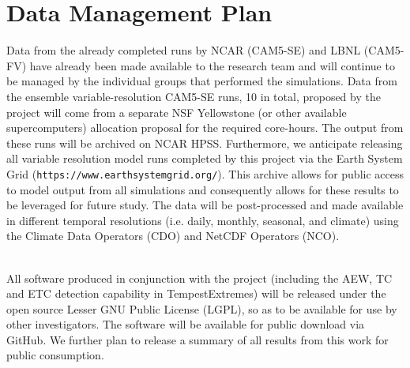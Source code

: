\documentclass[11pt]{article}
\begin{document}
\appendix

\setcounter{section}{9}

\section{Data Management Plan}

Data from the already completed runs by NCAR (CAM5-SE) and LBNL (CAM5-FV) have already been made available to the research team and will continue to be managed by the individual groups that performed the simulations. Data from the ensemble variable-resolution CAM5-SE runs, 10 in total, proposed by the project will come from a separate NSF Yellowstone (or other available supercomputers) allocation proposal for the required core-hours. The output from these runs will be archived on NCAR HPSS. Furthermore, we anticipate releasing all variable resolution model runs completed by this project via the Earth System Grid (\texttt{https://www.earthsystemgrid.org/}). This archive allows for public access to model output from all simulations and consequently allows for these results to be leveraged for future study. The data will be post-processed and made available in different temporal resolutions (i.e. daily, monthly, seasonal, and climate) using the Climate Data Operators (CDO) and NetCDF Operators (NCO).

\ \\

\noindent All software produced in conjunction with the project (including the AEW, TC and ETC detection capability in TempestExtremes) will be released under the open source Lesser GNU Public License (LGPL), so as to be available for use by other investigators. The software will be available for public download via GitHub. We further plan to release a summary of all results from this work for public consumption.

  
\end{document}
